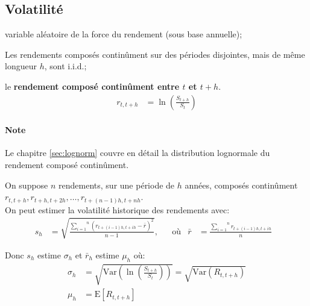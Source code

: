 \documentclass[10pt, french]{article}
\begin{document}
\begin{multicols*}{2}
\subsection{Volatilité}
\label{subsec:bintree-volatility}
\begin{distributions}[Notation]
\begin{description}[leftmargin = *]
	\item[$R$]	variable aléatoire de la force du rendement (sous base annuelle);
	\item[Hypothèse]	Les rendements composés continûment sur des périodes disjointes, mais de même longueur $h$, sont i.i.d.;
	\item[$r_{t, t + h}$]	le \textbf{rendement composé continûment entre $t$ et $t + h$}.
		\begin{align*}
		r_{t, t + h} &= \ln\left(\frac{S_{t + h}}{S_{t}}\right)
		\end{align*}
\end{description}
\end{distributions}

\paragraph{Note}	Le chapitre \ref{sec:lognorm} couvre en détail la distribution lognormale du rendement composé continûment.

On suppose $n$ rendements, sur une période de $h$ années, composés continûment $r_{t, t + h}, r_{t + h, t + 2h}, \dots, r_{t + (n - 1)h, t + nh}$. \\

On peut estimer la volatilité historique des rendements avec:
\begin{align*}
	s_{h}
	&=	\sqrt{\frac{\overset{n}{\underset{i = 1}{\sum}} (r_{t + (i - 1)h, t + ih} - \bar{r})^{2}}{n - 1}}, &
	&\text{où}&
	\bar{r}
	&=	\frac{\overset{n}{\underset{i = 1}{\sum}} r_{t + (i - 1)h, t + ih}}{n}	&
\end{align*}

Donc $s_{h}$ estime $\sigma_{h}$ et $\bar{r}_{h}$ estime $\mu_{h}$ où:
	\begin{align*}
	\sigma_{h}
	&=	\sqrt{\text{Var}\left(\ln\left( \frac{S_{t + h}}{S_{t}} \right)\right)}	
	=	\sqrt{\text{Var}(R_{t, t + h})}	\\
	\mu_{h}
	&=	\text{E}[R_{t, t + h}]
	\end{align*}



\end{multicols*}
\end{document}
